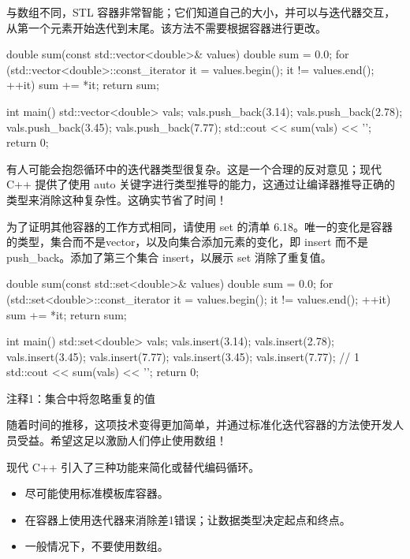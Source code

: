 与数组不同，STL 容器非常智能；它们知道自己的大小，并可以与迭代器交互，从第一个元素开始迭代到末尾。该方法不需要根据容器进行更改。


\begin{cpp}
double sum(const std::vector<double>& values) {
  double sum = 0.0;
  for (std::vector<double>::const_iterator it = values.begin();
      it != values.end(); ++it)
    sum += *it;
  return sum;
}

int main() {
  std::vector<double> vals;
  vals.push_back(3.14); vals.push_back(2.78);
  vals.push_back(3.45); vals.push_back(7.77);
  std::cout << sum(vals) << '\n';
  return 0;
}
\end{cpp}

有人可能会抱怨循环中的迭代器类型很复杂。这是一个合理的反对意见；现代 C++ 提供了使用 auto 关键字进行类型推导的能力，这通过让编译器推导正确的类型来消除这种复杂性。这确实节省了时间！

为了证明其他容器的工作方式相同，请使用 set 的清单 6.18。唯一的变化是容器的类型，集合而不是vector，以及向集合添加元素的变化，即 insert 而不是 push\_back。添加了第三个集合 insert，以展示 set 消除了重复值。


\begin{cpp}
double sum(const std::set<double>& values) {
  double sum = 0.0;
  for (std::set<double>::const_iterator it = values.begin();
      it != values.end(); ++it)
    sum += *it;
  return sum;
}

int main() {
  std::set<double> vals;
  vals.insert(3.14); vals.insert(2.78);
  vals.insert(3.45); vals.insert(7.77);
  vals.insert(3.45); vals.insert(7.77); // 1
  std::cout << sum(vals) << '\n';
  return 0;
}
\end{cpp}

{\footnotesize
注释1：集合中将忽略重复的值
}

随着时间的推移，这项技术变得更加简单，并通过标准化迭代容器的方法使开发人员受益。希望这足以激励人们停止使用数组！

现代 C++ 引入了三种功能来简化或替代编码循环。


\begin{itemize}
\item
尽可能使用标准模板库容器。

\item
在容器上使用迭代器来消除差1错误；让数据类型决定起点和终点。

\item
一般情况下，不要使用数组。
\end{itemize}

